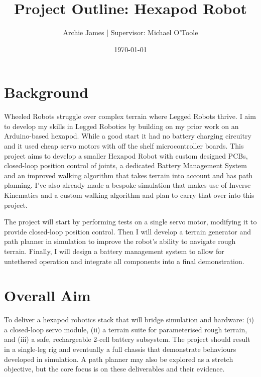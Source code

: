 \documentclass[a4paper,11pt]{article}
\title{Project Outline: Hexapod Robot}
\author{Archie James \quad | \quad Supervisor: Michael O'Toole}
\date{\today}
\begin{document}
\maketitle
\vspace{-1.2em}

\section{Background}
Wheeled Robots struggle over complex terrain where Legged Robots thrive. I aim to develop my skills in Legged Robotics by building on my prior work on an Arduino-based hexapod. While a good start it had no battery charging circuitry and it used cheap servo motors with off the shelf microcontroller boards. This project aims to develop a smaller Hexapod Robot with custom designed PCBs, closed-loop position control of joints, a dedicated Battery Management System and an improved walking algorithm that takes terrain into account and has path planning. I've also already made a bespoke simulation that makes use of Inverse Kinematics and a custom walking algorithm and plan to carry that over into this project.

The project will start by performing tests on a single servo motor, modifying it to provide closed-loop position control. Then I will develop a terrain generator and path planner in simulation to improve the robot's ability to navigate rough terrain. Finally, I will design a battery management system to allow for untethered operation and integrate all components into a final demonstration.

\section{Overall Aim}
To deliver a hexapod robotics stack that will bridge simulation and hardware: (i) a closed-loop servo module, (ii) a terrain suite for parameterised rough terrain, and (iii) a safe, rechargeable 2-cell battery subsystem. The project should result in a single-leg rig and eventually a full chassis that demonstrate behaviours developed in simulation. A path planner may also be explored as a stretch objective, but the core focus is on these deliverables and their evidence.
\end{document}

